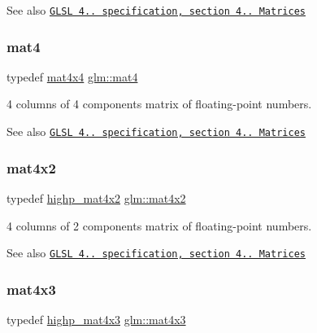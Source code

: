 \begin{DoxySeeAlso}{See also}
\href{http://www.opengl.org/registry/doc/GLSLangSpec.4.20.8.pdf}{\tt G\+L\+SL 4.. specification, section 4.. Matrices} 
\end{DoxySeeAlso}
\mbox{\label{group__core__types_ga7dcd2365c2e368e6af5b7adeb6a9c8df}} 
\subsubsection{\texorpdfstring{mat4}{mat4}}
{\footnotesize\ttfamily typedef \hyperlink{group__core__types_ga63e3ee9447ed593484140a9368e738ec}{mat4x4} \hyperlink{group__core__types_ga7dcd2365c2e368e6af5b7adeb6a9c8df}{glm\+::mat4}}

4 columns of 4 components matrix of floating-\/point numbers.

\begin{DoxySeeAlso}{See also}
\href{http://www.opengl.org/registry/doc/GLSLangSpec.4.20.8.pdf}{\tt G\+L\+SL 4.. specification, section 4.. Matrices} 
\end{DoxySeeAlso}
\mbox{\label{group__core__types_ga72cf8ec4f4cda85943f4683531e421bc}} 
\subsubsection{\texorpdfstring{mat4x2}{mat4x2}}
{\footnotesize\ttfamily typedef \hyperlink{group__core__precision_ga289d5d6b112dc6e3f545e7f98d3d0b5c}{highp\+\_\+mat4x2} \hyperlink{group__core__types_ga72cf8ec4f4cda85943f4683531e421bc}{glm\+::mat4x2}}

4 columns of 2 components matrix of floating-\/point numbers.

\begin{DoxySeeAlso}{See also}
\href{http://www.opengl.org/registry/doc/GLSLangSpec.4.20.8.pdf}{\tt G\+L\+SL 4.. specification, section 4.. Matrices} 
\end{DoxySeeAlso}
\mbox{\label{group__core__types_gad3f3f750dcdc74a9037342c5cae55f5e}} 
\subsubsection{\texorpdfstring{mat4x3}{mat4x3}}
{\footnotesize\ttfamily typedef \hyperlink{group__core__precision_ga549b3b126dfbf5f9fef6b76deb15cb4e}{highp\+\_\+mat4x3} \hyperlink{group__core__types_gad3f3f750dcdc74a9037342c5cae55f5e}{glm\+::mat4x3}}

